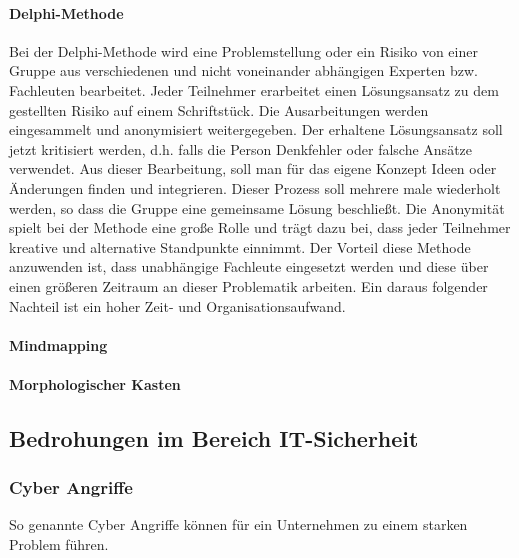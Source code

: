 \paragraph{Delphi-Methode}
Bei der Delphi-Methode wird eine Problemstellung oder ein Risiko von einer Gruppe aus verschiedenen und nicht voneinander abhängigen Experten bzw. Fachleuten bearbeitet. 
Jeder Teilnehmer erarbeitet einen Lösungsansatz zu dem gestellten Risiko auf einem Schriftstück.
Die Ausarbeitungen werden eingesammelt und anonymisiert weitergegeben.
Der erhaltene Lösungsansatz soll jetzt kritisiert werden, d.h. falls die Person Denkfehler oder falsche Ansätze verwendet. Aus dieser Bearbeitung, soll man für das eigene Konzept Ideen oder Änderungen finden und integrieren.
Dieser Prozess soll mehrere male wiederholt werden, so dass die Gruppe eine gemeinsame Lösung beschließt.
Die Anonymität spielt bei der Methode eine große Rolle und trägt dazu bei, dass jeder Teilnehmer kreative und alternative Standpunkte einnimmt.
Der Vorteil diese Methode anzuwenden ist, dass unabhängige Fachleute eingesetzt werden und diese über einen größeren Zeitraum an dieser Problematik arbeiten.
Ein daraus folgender Nachteil ist ein hoher Zeit- und Organisationsaufwand.


\paragraph{Mindmapping}


\paragraph{Morphologischer Kasten}






\newpage
\subsection{Bedrohungen im Bereich IT-Sicherheit}
\subsubsection{Cyber Angriffe}
So genannte Cyber Angriffe können für ein Unternehmen zu einem starken Problem führen.

\newpage